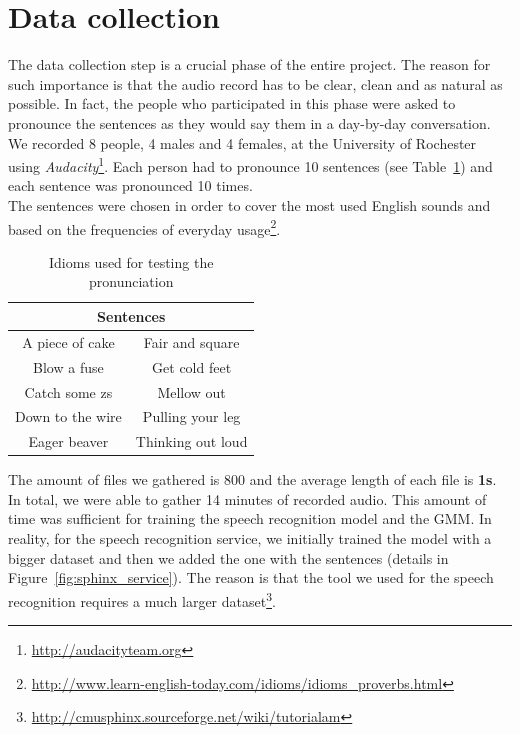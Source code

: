 \section{Data collection}
\label{sec:data_collection}

The data collection step is a crucial phase of the entire project. The reason for such importance is that the audio record has to be clear, clean and as natural as possible. In fact, the people who participated in this phase were asked to pronounce the sentences as they would say them in a day-by-day conversation. \\

\noindent We recorded 8 people, 4 males and 4 females, at the University of Rochester using \textit{Audacity}\footnote{\url{http://audacityteam.org}}. Each person had to pronounce 10 sentences (see Table~\ref{table:sentences}) and each sentence was pronounced 10 times. \\
\noindent The sentences were chosen in order to cover the most used English sounds and based on the frequencies of everyday usage\footnote{\url{http://www.learn-english-today.com/idioms/idioms_proverbs.html}}.

\begin{table}[!ht]
	\centering
	\begin{tabular}{|c|c|}
		\hline
		\multicolumn{2}{|c|}{Sentences}      \\ \hline
		A piece of cake  & Fair and square   \\ \hline
		Blow a fuse      & Get cold feet     \\ \hline
		Catch some zs    & Mellow out        \\ \hline
		Down to the wire & Pulling your leg  \\ \hline
		Eager beaver     & Thinking out loud \\ \hline
	\end{tabular}
	\caption{Idioms used for testing the pronunciation}
	\label{table:sentences}
\end{table}

\noindent The  amount of files we gathered is 800 and the average length of each file is \textbf{1s}. In total, we were able to gather 14 minutes of recorded audio. This amount of time was sufficient for training the speech recognition model and the GMM. In reality, for the speech recognition service, we initially trained the model with a bigger dataset and then we added the one with the sentences (details in Figure~\ref{fig:sphinx_service}). The reason is that the tool we used for the speech recognition requires a much larger dataset\footnote{\url{http://cmusphinx.sourceforge.net/wiki/tutorialam}}.

